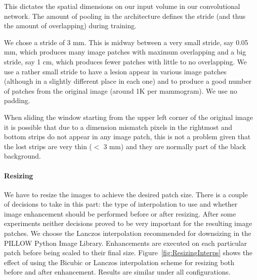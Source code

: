 This dictates the spatial dimensions on our input volume in our convolutional network. The amount of pooling in the architecture defines the stride (and thus the amount of overlapping) during training.

We chose a stride of 3 mm. This is midway between a very small stride, say 0.05 mm, which produces many image patches with maximum overlapping and a big stride, say 1 cm, which produces fewer patches with little to no overlapping. We use a rather small stride to have a lesion appear in various image patches (although in a slightly different place in each one) and to produce a good number of patches from the original image (around 1K per mammogram). We use no padding.

When sliding the window starting from the upper left corner of the original image it is possible that due to a dimension mismatch pixels in the rightmost and bottom strips do not appear in any image patch, this is not a problem given that the lost strips are very thin ($<$ 3 mm) and they are normally part of the black background.

\paragraph{Resizing}
We have to resize the images to achieve the desired patch size. There is a couple of decisions to take in this part: the type of interpolation to use and whether image enhancement should be performed before or after resizing. After some experiments neither decisions proved to be very important for the resulting image patches. We choose the Lanczos interpolation recommended for downsizing in the PILLOW Python Image Library. Enhancements are executed on each particular patch before being scaled to their final size. Figure~\ref{fig:ResizingInterps} shows the effect of using the Bicubic or Lanczos interpolation scheme for resizing both before and after enhancement. Results are similar under all configurations.

